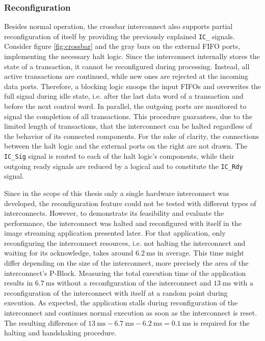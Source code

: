\subsubsection{Reconfiguration}
Besides normal operation, the crossbar interconnect also supports partial
reconfiguration of itself by providing the previously explained
\lstinline{IC_} signals. Consider figure \ref{fig:crossbar} and the gray bars
on the external \ac{FIFO} ports, implementing the necessary halt logic. Since
the interconnect internally stores the state of a transaction, it cannot be
reconfigured during processing. Instead, all active transactions are
continued, while new ones are rejected at the incoming data ports. Therefore,
a blocking logic snoops the input \acp{FIFO} and overwrites the full signal
during idle state, i.e. after the last data word of a transaction and before
the next control word. In parallel, the outgoing ports are monitored to signal
the completion of all transactions. This procedure guarantees, due to the
limited length of transactions, that the interconnect can be halted regardless
of the behavior of its connected components.  For the sake of clarity, the
connections between the halt logic and the external ports on the right are not
drawn. The \lstinline{IC_Sig} signal is routed to each of the halt logic's
components, while their outgoing ready signals are reduced by a logical and to
constitute the \lstinline{IC_Rdy} signal.

Since in the scope of this thesis only a single hardware interconnect was
developed, the reconfiguration feature could not be tested with different
types of interconnects. However, to demonstrate its feasibility and evaluate
the performance, the interconnect was halted and reconfigured with itself in
the image streaming application presented later. For that application, only
reconfiguring the interconnect resources, i.e. not halting the interconnect
and waiting for its acknowledge, takes around $\SI{6.2}{\milli\second}$ in
average. This time might differ depending on the size of the interconnect,
more precisely the area of the interconnect's P-Block. Measuring the total
execution time of the application results in $\SI{6.7}{\milli\second}$ without
a reconfiguration of the interconnect and $\SI{13}{\milli\second}$ with a
reconfiguration of the interconnect with itself at a random point during
execution. As expected, the application stalls during reconfiguration of the
interconnect and continues normal execution as soon as the interconnect is
reset. The resulting difference of $\SI{13}{\milli\second} -
\SI{6.7}{\milli\second} - \SI{6.2}{\milli\second = \SI{0.1}{\milli\second}}$
is required for the halting and handshaking procedure.

